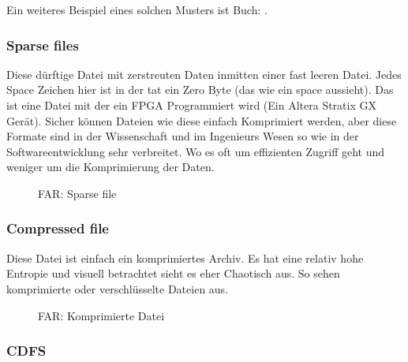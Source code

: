 Ein weiteres Beispiel eines solchen Musters ist Buch:
.

\clearpage
\subsubsection{Sparse files} %

Diese dürftige Datei mit zerstreuten Daten inmitten einer fast leeren Datei.
Jedes Space Zeichen hier ist in der tat ein Zero Byte (das wie ein space aussieht). %
Das ist eine Datei mit der ein FPGA Programmiert wird (Ein Altera Stratix GX Gerät).
Sicher können Dateien wie diese einfach Komprimiert werden, aber diese Formate sind in 
der Wissenschaft und im Ingenieurs Wesen so wie in der Softwareentwicklung sehr verbreitet.
Wo es oft um effizienten Zugriff geht und weniger um die Komprimierung der Daten.


\begin{figure}[H]
\centering
{}
\caption{FAR: Sparse file}
\end{figure}

\clearpage
\subsubsection{Compressed file} %

Diese Datei ist einfach ein komprimiertes Archiv. 
Es hat eine relativ hohe Entropie und visuell betrachtet sieht es 
eher Chaotisch aus. So sehen komprimierte oder verschlüsselte Dateien aus.

\begin{figure}[H]
\centering
{}
\caption{FAR: Komprimierte Datei}
\end{figure}

\clearpage
\subsubsection{\ac{CDFS}}


